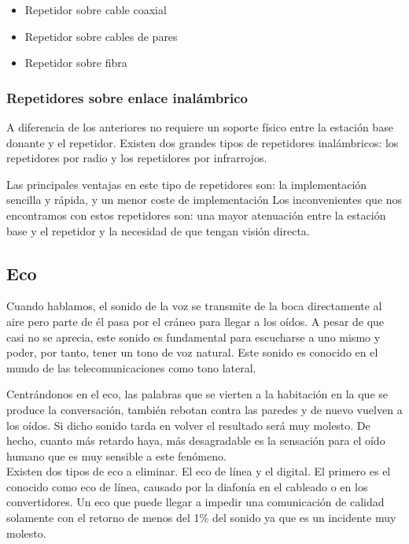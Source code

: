 \documentclass[a4paper]{article}
\begin{document}
\begin{itemize}
  \item Repetidor sobre cable coaxial

  \item Repetidor sobre cables de pares
  
  \item Repetidor sobre fibra  
\end{itemize}


\subsubsection{Repetidores sobre enlace inalámbrico}

A diferencia de los anteriores no requiere un soporte físico entre la
estación base donante y el repetidor. Existen dos grandes tipos de
repetidores inalámbricos: los repetidores por radio y los repetidores
por infrarrojos.

Las principales ventajas en este tipo de repetidores son: la
implementación sencilla y rápida, y un menor coste de implementación Los
inconvenientes que nos encontramos con estos repetidores son: una mayor
atenuación entre la estación base y el repetidor y la necesidad de que
tengan visión directa.

\subsection{Eco}

Cuando hablamos, el sonido de la voz se transmite de la boca
directamente al aire pero parte de él pasa por el cráneo para llegar a
los oídos. A pesar de que casi no se aprecia, este sonido es fundamental
para escucharse a uno mismo y poder, por tanto, tener un tono de voz
natural. Este sonido es conocido en el mundo de las telecomunicaciones
como tono lateral.

Centrándonos en el eco, las palabras que se vierten a la habitación en
la que se produce la conversación, también rebotan contra las paredes y
de nuevo vuelven a los oídos. Si dicho sonido tarda en volver el
resultado será muy molesto. De hecho, cuanto más retardo haya, más
desagradable es la sensación para el oído humano que es muy sensible a
este fenómeno.\\[2\baselineskip]Existen dos tipos de eco a eliminar. El
eco de línea y el digital. El primero es el conocido como eco de línea,
causado por la diafonía en el cableado o en los convertidores. Un eco
que puede llegar a impedir una comunicación de calidad solamente con el
retorno de menos del 1\% del sonido ya que es un incidente muy molesto.
\end{document}
